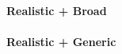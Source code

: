 \paragraph{Realistic + Broad} \label{sec:realisticbroad}

\paragraph{Realistic + Generic} \label{sec:realisticgeneric}






